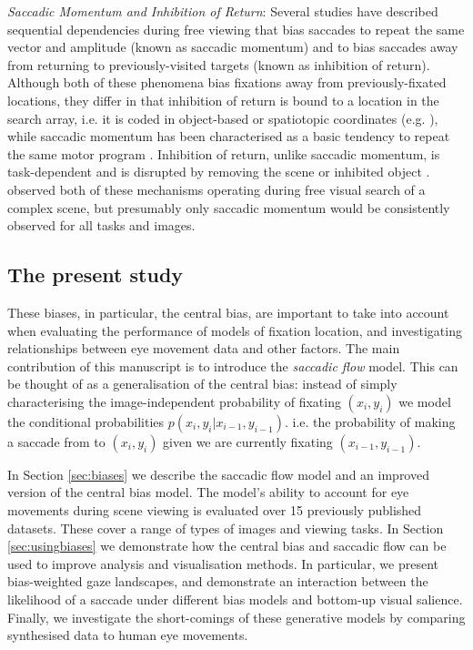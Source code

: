 \textit{Saccadic Momentum and Inhibition of Return}: Several studies have described sequential dependencies during free viewing that bias saccades to repeat the same vector and amplitude (known as saccadic momentum) and to bias saccades away from returning to previously-visited targets (known as inhibition of return). Although both of these phenomena bias fixations away from previously-fixated locations, they differ in that inhibition of return is bound to a location in the search array, i.e. it is coded in object-based or spatiotopic coordinates (e.g. \cite{krueger-hunt2013}), while saccadic momentum has been characterised as a basic tendency to repeat the same motor program \citep{wang2011}. Inhibition of return, unlike saccadic momentum, is task-dependent \citep{dodd2009} and is disrupted by removing the scene or inhibited object  \citep{klein-macinnes1999, takeda-yagi2000}.  \cite{macinnes2014} observed both of these mechanisms operating during free visual search of a complex scene, but presumably only saccadic momentum would be consistently observed for all tasks and images. 

\subsection{The present study}

These biases, in particular, the central bias, are important to take into account when evaluating the performance of models of fixation location, and investigating relationships between eye movement data and other factors. The main contribution of this manuscript is to introduce the \textit{saccadic flow} model. This can be thought of as a generalisation of the central bias: instead of simply characterising the image-independent probability of fixating $(x_i, y_i)$ we model the conditional probabilities $p(x_i,y_i|x_{i-1}, y_{i-1})$. i.e. the probability of making a saccade from to $(x_i,y_i)$ given we are currently fixating $(x_{i-1}, y_{i-1})$.

In Section \ref{sec:biases} we describe the saccadic flow model and an improved version of the central bias model. The model's ability to account for eye movements during scene viewing is evaluated over 15 previously published datasets. These cover a range of types of images and viewing tasks. In Section \ref{sec:usingbiases} we demonstrate how the central bias and saccadic flow can be used to improve analysis and visualisation methods. In particular, we present bias-weighted gaze landscapes, and demonstrate an interaction between the likelihood of a saccade under different bias models and bottom-up visual salience. Finally, we investigate the short-comings of these generative models by comparing synthesised data to human eye movements. 